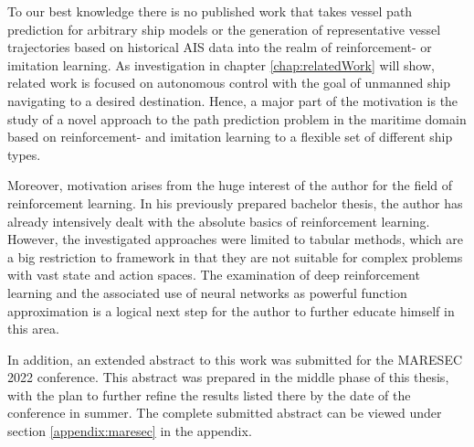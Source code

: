To our best knowledge there is no published work that takes vessel path prediction for arbitrary ship models or the generation of representative vessel trajectories based on historical AIS data into the realm of reinforcement- or imitation learning. As investigation in chapter \ref{chap:relatedWork} will show, related work is focused on autonomous control with the goal of unmanned ship navigating to a desired destination. Hence, a major part of the motivation is the study of a novel approach to the path prediction problem in the maritime domain based on reinforcement- and imitation learning to a flexible set of different ship types.
\par
Moreover, motivation arises from the huge interest of the author for the field of reinforcement learning. In his previously prepared bachelor thesis, the author has already intensively dealt with the absolute basics of reinforcement learning.  However, the investigated approaches were limited to tabular methods, which are a big restriction to framework in that they are not suitable for complex problems with vast state and action spaces. The examination of deep reinforcement learning and the associated use of neural networks as powerful function approximation is a logical next step for the author to further educate himself in this area.
\par
In addition, an extended abstract to this work was submitted for the MARESEC 2022 conference. This abstract was prepared in the middle phase of this thesis, with the plan to further refine the results listed there by the date of the conference in summer. The complete submitted abstract can be viewed under section \ref{appendix:maresec} in the appendix.